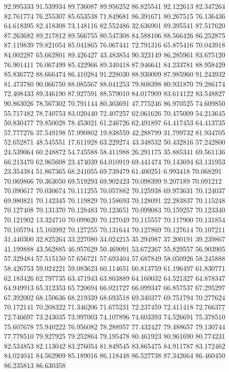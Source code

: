 92.995333
91.539934
89.736087
89.956252
86.825541
92.122613
82.347264
82.761774
76.255307
85.653538
71.849681
86.391671
80.267515
76.136436
64.618395
82.418308
73.148116
82.552486
32.636901
89.395541
87.517620
87.263682
89.217812
89.566755
80.547308
84.588106
88.566426
86.252875
87.119839
79.821054
85.041865
76.067441
72.791316
65.875416
70.043918
84.002287
65.662801
89.426427
43.483854
90.323149
86.285961
83.675120
76.901411
76.067499
85.422966
89.340418
87.946641
84.233781
88.958429
85.836772
88.666474
86.410284
91.228030
88.930009
87.985960
91.243932
81.473780
90.066750
88.085567
88.041253
79.808398
80.931870
79.286174
72.408433
89.346190
87.927591
88.579010
84.017909
83.614122
83.548827
90.863026
78.567302
70.791144
80.303691
47.775246
86.970525
74.609850
55.717482
78.740753
83.020440
72.407257
62.061626
70.475009
54.213645
50.830477
79.850028
78.453021
61.246726
62.491897
64.417453
64.413735
57.777276
37.549198
57.990802
19.838559
42.288799
31.799732
81.934705
52.652871
48.545551
17.611928
63.229274
43.348532
50.432816
57.242800
24.539064
60.248872
54.745588
58.411988
26.291175
35.885341
69.561136
66.213470
62.965608
23.474039
64.010919
69.441474
70.143694
63.131953
23.354384
51.867365
68.241055
69.739479
61.400251
6.993418
70.068291
70.069866
70.363050
69.519293
69.902423
70.098399
9.207189
70.091212
70.090617
70.030674
70.111255
70.057882
70.125938
69.973631
70.124037
69.980821
70.142345
70.119829
70.158693
70.128091
22.283837
70.115248
70.127408
70.131370
70.128483
70.123651
70.099083
70.159257
70.123340
70.121902
13.324710
70.099620
70.127049
70.115557
70.117900
70.131854
70.105794
15.103992
70.127255
70.131644
70.127869
70.127614
70.107211
31.440300
32.825264
33.227080
34.024215
35.294987
37.200191
39.239867
41.199888
43.562885
46.957629
50.469091
53.672367
55.829557
56.903905
57.329484
57.515150
57.656721
57.693404
57.687849
58.050926
58.245888
58.426753
59.024221
59.083623
60.114651
60.813759
61.196497
61.830771
62.183426
62.797735
63.471943
63.803889
64.160032
64.521327
64.878347
64.949913
65.312353
65.720694
66.021727
66.099347
66.857537
67.295297
67.392002
68.150636
68.219339
68.693518
69.340377
69.751794
70.277624
70.172141
70.208322
71.346206
71.675231
72.237459
72.411418
72.766377
72.746697
73.243035
73.997003
74.107896
74.603393
74.526691
75.378510
75.607678
75.940222
76.956082
78.288957
77.432427
79.488657
79.130744
77.778510
79.927925
79.252864
79.195478
80.461923
80.961690
80.774231
82.534853
82.113042
83.276054
81.849545
83.865475
84.911787
83.172462
84.024041
84.562909
85.189016
86.118448
86.527738
87.342664
86.460450
86.235813
86.630358
